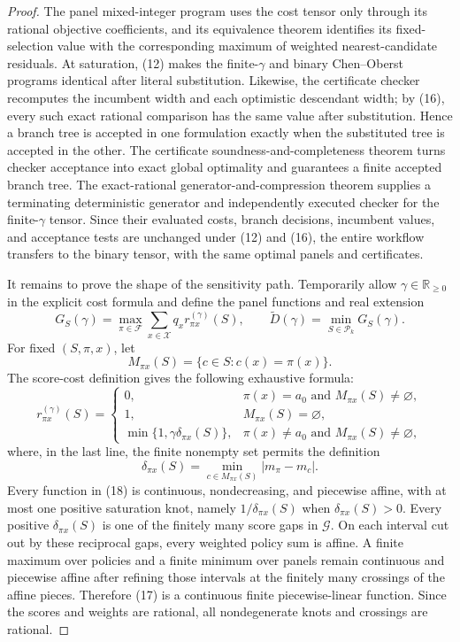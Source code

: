 \documentclass{article}
\begin{document}
\begin{proof}
The panel mixed-integer program uses the cost tensor only through its
rational objective coefficients, and its equivalence theorem identifies
its fixed-selection value with the corresponding maximum of weighted
nearest-candidate residuals.  At saturation, (12) makes the
finite-\(\gamma\) and binary Chen--Oberst programs identical after literal
substitution.  Likewise, the certificate checker recomputes the incumbent
width and each optimistic descendant width; by (16), every such exact
rational comparison has the same value after substitution.  Hence a branch
tree is accepted in one formulation exactly when the substituted tree is
accepted in the other.  The certificate soundness-and-completeness theorem
turns checker acceptance into exact global optimality and guarantees a
finite accepted branch tree.  The exact-rational
generator-and-compression theorem supplies a terminating deterministic
generator and independently executed checker for the finite-\(\gamma\)
tensor.  Since their evaluated costs, branch decisions, incumbent values,
and acceptance tests are unchanged under (12) and (16), the entire
workflow transfers to the binary tensor, with the same optimal panels and
certificates.

It remains to prove the shape of the sensitivity path.  Temporarily allow
\(\gamma\in\mathbb R_{\geq0}\) in the explicit cost formula and define
the panel functions and real extension
\[
G_S(\gamma)=\max_{\pi\in\mathcal F}
\sum_{x\in\mathcal X}q_x r^{(\gamma)}_{\pi x}(S),
\qquad
\widetilde D(\gamma)=\min_{S\in\mathcal P_k}G_S(\gamma).            \tag{17}
\]
For fixed \((S,\pi,x)\), let
\[
M_{\pi x}(S)=\{c\in S:c(x)=\pi(x)\}.
\]
The score-cost definition gives the following exhaustive formula:
\[
r^{(\gamma)}_{\pi x}(S)=
\begin{cases}
0,&\pi(x)=a_0\text{ and }M_{\pi x}(S)\neq\varnothing,\\
1,&M_{\pi x}(S)=\varnothing,\\
\min\{1,\gamma\delta_{\pi x}(S)\},
&\pi(x)\neq a_0\text{ and }M_{\pi x}(S)\neq\varnothing,
\end{cases}                                                         \tag{18}
\]
where, in the last line, the finite nonempty set permits the definition
\[
\delta_{\pi x}(S)=\min_{c\in M_{\pi x}(S)}|m_\pi-m_c|.
\]
Every function in (18) is continuous, nondecreasing, and piecewise affine,
with at most one positive saturation knot, namely
\(1/\delta_{\pi x}(S)\) when \(\delta_{\pi x}(S)>0\).  Every positive
\(\delta_{\pi x}(S)\) is one of the finitely many score gaps in
\(\mathcal G\).  On each interval cut out by these reciprocal gaps, every
weighted policy sum is affine.  A finite maximum over policies and a finite
minimum over panels remain continuous and piecewise affine after refining
those intervals at the finitely many crossings of the affine pieces.
Therefore (17) is a continuous finite piecewise-linear function.  Since
the scores and weights are rational, all nondegenerate knots and crossings
are rational.


\end{proof}
\end{document}
